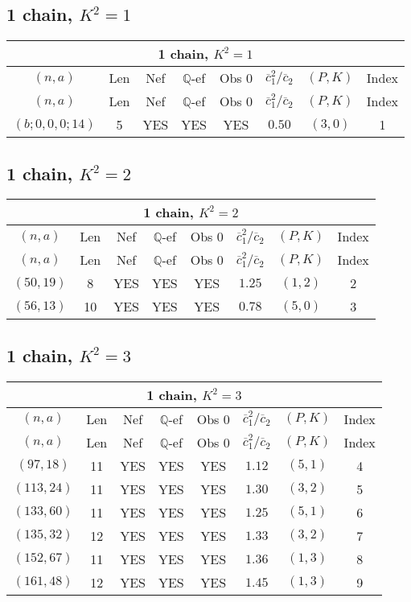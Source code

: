 \subsection{1 chain, $K^2 = 1$}
\begin{longtable}{|c|c|c|c|c|c|c|c|}
\hline
\multicolumn{8}{|c|}{1 chain, $K^2 = 1$}\\
\hline
$(n,a)$ & Len & Nef & $\mathbb Q$-ef & Obs 0 & $\overline c_1^2 / \overline c_2$ & $(P,K)$ & Index\\
\hline
\endfirsthead

\hline
$(n,a)$ & Len & Nef & $\mathbb Q$-ef & Obs 0 & $\overline c_1^2 / \overline c_2$ & $(P,K)$ & Index\\
\hline
\endhead
\hline
\endfoot

$(b;0,0,0;14)$ & 5 & YES & YES & YES & $0.50$ & $(3,0)$ & 1
\end{longtable}
\subsection{1 chain, $K^2 = 2$}
\begin{longtable}{|c|c|c|c|c|c|c|c|}
\hline
\multicolumn{8}{|c|}{1 chain, $K^2 = 2$}\\
\hline
$(n,a)$ & Len & Nef & $\mathbb Q$-ef & Obs 0 & $\overline c_1^2 / \overline c_2$ & $(P,K)$ & Index\\
\hline
\endfirsthead

\hline
$(n,a)$ & Len & Nef & $\mathbb Q$-ef & Obs 0 & $\overline c_1^2 / \overline c_2$ & $(P,K)$ & Index\\
\hline
\endhead
\hline
\endfoot

$(50,19)$ & 8 & YES & YES & YES & $1.25$ & $(1,2)$ & 2\\
$(56,13)$ & 10 & YES & YES & YES & $0.78$ & $(5,0)$ & 3
\end{longtable}
\subsection{1 chain, $K^2 = 3$}
\begin{longtable}{|c|c|c|c|c|c|c|c|}
\hline
\multicolumn{8}{|c|}{1 chain, $K^2 = 3$}\\
\hline
$(n,a)$ & Len & Nef & $\mathbb Q$-ef & Obs 0 & $\overline c_1^2 / \overline c_2$ & $(P,K)$ & Index\\
\hline
\endfirsthead

\hline
$(n,a)$ & Len & Nef & $\mathbb Q$-ef & Obs 0 & $\overline c_1^2 / \overline c_2$ & $(P,K)$ & Index\\
\hline
\endhead
\hline
\endfoot

$(97,18)$ & 11 & YES & YES & YES & $1.12$ & $(5,1)$ & 4\\
$(113,24)$ & 11 & YES & YES & YES & $1.30$ & $(3,2)$ & 5\\
$(133,60)$ & 11 & YES & YES & YES & $1.25$ & $(5,1)$ & 6\\
$(135,32)$ & 12 & YES & YES & YES & $1.33$ & $(3,2)$ & 7\\
$(152,67)$ & 11 & YES & YES & YES & $1.36$ & $(1,3)$ & 8\\
$(161,48)$ & 12 & YES & YES & YES & $1.45$ & $(1,3)$ & 9
\end{longtable}
